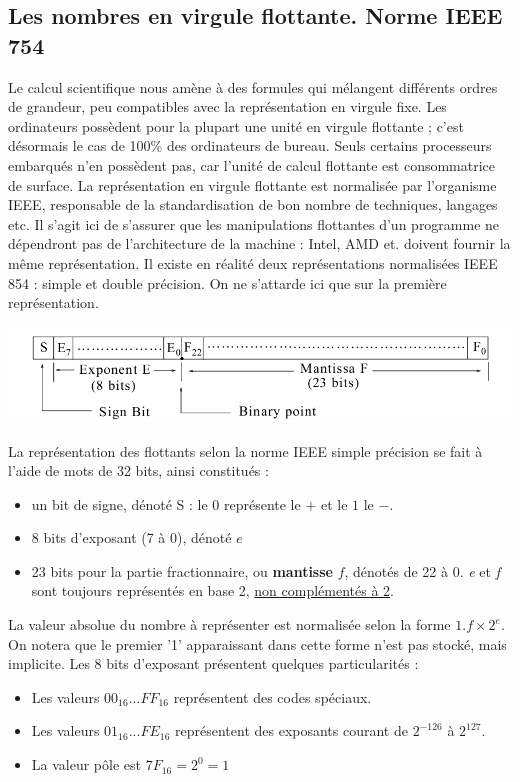 \subsection{Les nombres en virgule flottante. Norme IEEE 754}
Le calcul scientifique nous amène à des formules qui mélangent différents ordres de grandeur, peu compatibles avec
la représentation en virgule fixe. Les ordinateurs possèdent pour la plupart une unité en virgule flottante ; c'est
désormais le cas de 100\% des ordinateurs de bureau. Seuls certains processeurs embarqués n'en possèdent pas, car
l'unité de calcul flottante est consommatrice de surface. La représentation en virgule flottante est normalisée par
l'organisme IEEE, responsable de la standardisation de bon nombre de techniques, langages etc. Il s'agit ici de
s'assurer que les manipulations flottantes d'un programme ne dépendront pas de l'architecture de la machine : Intel,
AMD et. doivent fournir la même représentation. Il existe en réalité deux représentations normalisées IEEE 854 :
simple et double précision. On ne s'attarde ici que sur la première représentation.\\

\begin{center}
 \includegraphics[scale=0.3]{./figures/ieee_854.png}
\end{center}

La représentation des flottants selon la norme IEEE simple précision se fait à l'aide de mots de 32 bits, ainsi constitués :
\begin{itemize}
\item un bit de signe, dénoté S : le $0$ représente le $+$ et le $1$ le $-$.
\item 8 bits d'exposant (7 à 0), dénoté $e$
\item 23 bits pour la partie fractionnaire, ou \textbf{mantisse} $f$, dénotés de 22 à 0. {\it e} et {\it f} sont toujours représentés en base 2, \underline{non complémentés à 2}.
\end{itemize}

La valeur absolue du nombre à représenter est normalisée selon la forme $1.f\times 2^e$. On notera que le premier '1' apparaissant dans cette forme n'est pas stocké, mais implicite.
Les 8 bits d'exposant présentent quelques particularités :
\begin{itemize}
  \item Les valeurs $00_{16}...FF_{16}$ représentent des codes spéciaux.
  \item Les valeurs $01_{16}...FE_{16}$ représentent des exposants courant de $2^{-126}$ à $2^{127}$.
  \item La valeur pôle est $7F_{16}=2^0=1$
\end{itemize}

